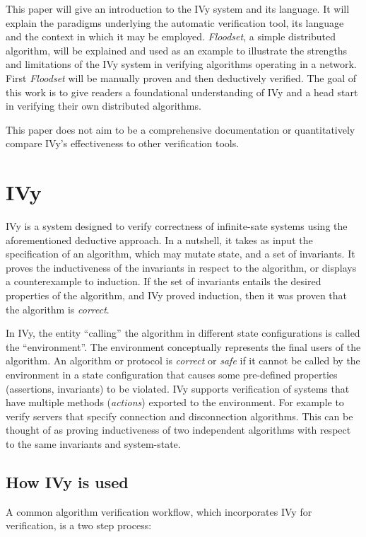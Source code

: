 \documentclass[fleqn]{article}
\begin{document}
  This paper will give an introduction to the IVy system and its language. It will explain the paradigms underlying the automatic verification tool, its language and the context in which it may be employed.  \textit{Floodset}, a simple distributed algorithm, will be explained and used as an example to illustrate the strengths and limitations of the IVy system in verifying algorithms operating in a network. First \textit{Floodset} will be manually proven and then deductively verified.  The goal of this work is to give readers a foundational understanding of IVy and a head start in verifying their own distributed algorithms.

  This paper does not aim to be a comprehensive documentation or quantitatively compare IVy's effectiveness to other verification tools.

\section{IVy}
IVy is a system designed to verify correctness of infinite-sate systems using the aforementioned deductive approach. In a nutshell, it takes as input the specification of an algorithm, which may mutate state, and a set of invariants. It proves the inductiveness of the invariants in respect to the algorithm, or displays a counterexample to induction. If the set of invariants entails the desired properties of the algorithm, and IVy proved induction, then it was proven that the algorithm is \textit{correct}.

In IVy, the entity ``calling'' the algorithm in different state configurations is called the ``environment''. The environment conceptually represents the final users of the algorithm. An algorithm or protocol is \textit{correct} or \textit{safe} if it cannot be called by the environment in a state configuration that causes some pre-defined properties (assertions, invariants) to be violated. IVy supports verification of systems that have multiple methods (\textit{actions}) exported to the environment. For example to verify servers that specify connection and disconnection algorithms. This can be thought of as proving inductiveness of two independent algorithms with respect to the same invariants and system-state.

\subsection{How IVy is used}

A common algorithm verification workflow, which incorporates IVy for verification, is a two step process:
\end{document}
